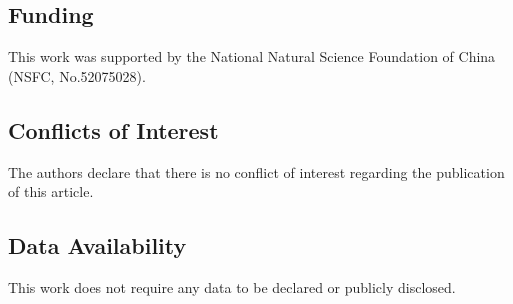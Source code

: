 \documentclass{article}
\begin{document}
\subsection*{Funding}

This work was supported by the National Natural Science Foundation of China (NSFC, No.52075028).

\subsection*{Conflicts of Interest}

The authors declare that there is no conflict of interest regarding the publication of this article.

\subsection*{Data Availability}

This work does not require any data to be declared or publicly disclosed.



\end{document}
